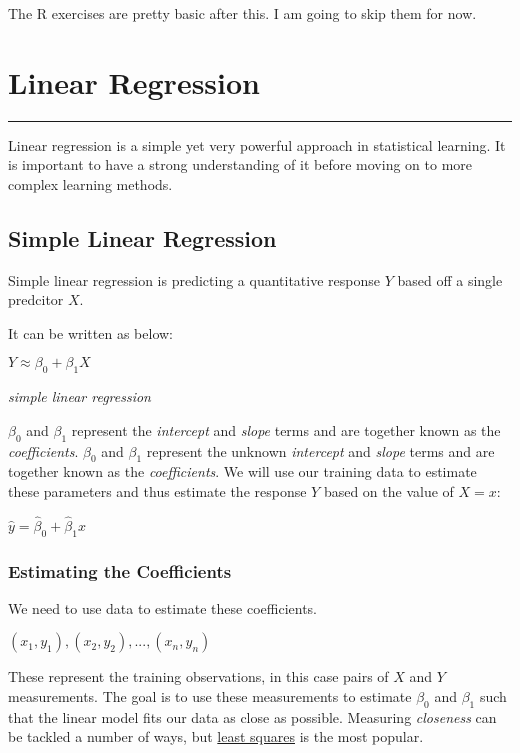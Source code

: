\documentclass[]{book}
\begin{document}
The R exercises are pretty basic after this. I am going to skip them for now.

\hypertarget{linear-regression}{%
\chapter{Linear Regression}\label{linear-regression}}

\begin{center}\rule{0.5\linewidth}{\linethickness}\end{center}

Linear regression is a simple yet very powerful approach in statistical learning. It is important to have a strong understanding of it before moving on to more complex learning methods.

\hypertarget{simple-linear-regression}{%
\section{Simple Linear Regression}\label{simple-linear-regression}}

Simple linear regression is predicting a quantitative response \(Y\) based off a single predcitor \(X\).

It can be written as below:

\(Y \approx \beta_0 + \beta_1X\)

\emph{simple linear regression}

\(\beta_0\) and \(\beta_1\) represent the \emph{intercept} and \emph{slope} terms and are together known as the \emph{coefficients}.
\(\beta_0\) and \(\beta_1\) represent the unknown \emph{intercept} and \emph{slope} terms and are together known as the \emph{coefficients}. We will use our training data to estimate these parameters and thus estimate the response \(Y\) based on the value of \(X = x\):

\(\hat y = \hat\beta_0 + \hat\beta_1x\)

\hypertarget{estimating-the-coefficients}{%
\subsection{Estimating the Coefficients}\label{estimating-the-coefficients}}

We need to use data to estimate these coefficients.

\((x_1,y_1), (x_2,y_2),..., (x_n,y_n)\)

These represent the training observations, in this case pairs of \(X\) and \(Y\) measurements. The goal is to use these measurements to estimate \(\beta_0\) and \(\beta_1\) such that the linear model fits our data as close as possible. Measuring \emph{closeness} can be tackled a number of ways, but \href{https://en.wikipedia.org/wiki/Least_squares}{least squares} is the most popular.
\end{document}
